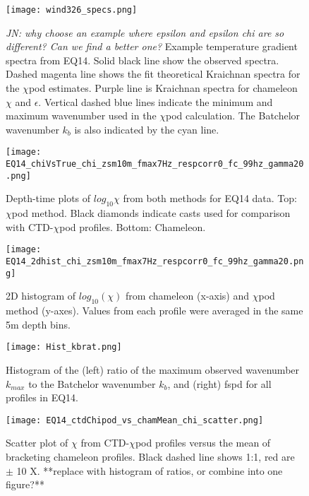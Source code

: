 \documentclass{ametsoc}
\begin{document}
\begin{figure}[t]
  \noindent\texttt{[image: wind326\_specs.png]}\\
  \caption{{\em JN: why choose an example where epsilon and epsilon chi are so different?  Can we find a better one?} Example temperature gradient spectra from EQ14. Solid black line show the observed spectra. Dashed magenta line shows the fit theoretical Kraichnan spectra for the $\chi$pod estimates. Purple line is Kraichnan spectra for chameleon $\chi$ and $\epsilon$. Vertical dashed blue lines indicate the minimum and maximum wavenumber used in the $\chi$pod calculation. The Batchelor wavenumber $k_b$ is also indicated by the cyan line.}
  \label{specexamp}
\end{figure}


\begin{figure}[t]
  \noindent\texttt{[image: EQ14\_chiVsTrue\_chi\_zsm10m\_fmax7Hz\_respcorr0\_fc\_99hz\_gamma20.png]}\\
  \caption{Depth-time plots of $log_{10}\chi$ from both methods for EQ14 data. Top: $\chi$pod method. Black diamonds indicate casts used for comparison with CTD-$\chi$pod profiles. Bottom: Chameleon.}
  \label{eq14_eps_pcolor}
\end{figure}


\begin{figure}[t]
  \noindent\texttt{[image: EQ14\_2dhist\_chi\_zsm10m\_fmax7Hz\_respcorr0\_fc\_99hz\_gamma20.png]}\\
  \caption{2D histogram of $log_{10}(\chi)$ from chameleon (x-axis) and $\chi$pod method (y-axes). Values from each profile were averaged in the same 5m depth bins. }
  \label{eq14_chi_2dhist}
\end{figure}


\begin{figure}[t]
  \noindent\texttt{[image: Hist\_kbrat.png]}\\
  \caption{Histogram of the (left) ratio of the maximum observed wavenumber $k_{max}$ to the Batchelor wavenumber $k_b$, and (right) fspd for all profiles in EQ14. }
  \label{histkbrat}
\end{figure}

\begin{figure}[t]
  \noindent\texttt{[image: EQ14\_ctdChipod\_vs\_chamMean\_chi\_scatter.png]}\\
  \caption{Scatter plot of $\chi$ from CTD-$\chi$pod profiles versus the mean of bracketing chameleon profiles. Black dashed line shows 1:1, red are $\pm$ 10 X. **replace with histogram of ratios, or combine into one figure?**}
  \label{eq14_cdtChi_vs_cham}
\end{figure}
\end{document}
